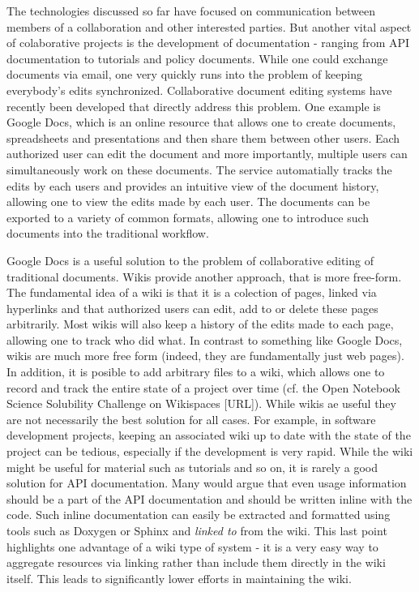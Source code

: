 \documentclass[12pt]{book}
\begin{document}
The technologies discussed so far have focused on communication
between members of a collaboration and other interested parties. But
another vital aspect of colaborative projects is the development of
documentation - ranging from API documentation to tutorials and policy
documents. While one could exchange documents via email, one very
quickly runs into the problem of keeping everybody's edits
synchronized. Collaborative document editing systems have recently
been developed that directly address this problem. One example is
Google Docs, which is an online resource that allows one to create
documents, spreadsheets and presentations and then share them between
other users. Each authorized user can edit the document and more
importantly, multiple users can simultaneously work on these
documents. The service automatially tracks the edits by each users and
provides an intuitive view of the document history, allowing one to
view the edits made by each user. The documents can be exported to a
variety of common formats, allowing one to introduce such documents
into the traditional workflow.

Google Docs is a useful solution to the problem of collaborative
editing of traditional documents. Wikis provide another approach, that
is more free-form. The fundamental idea of a wiki is that it is a
colection of pages, linked via hyperlinks and that authorized users
can edit, add to or delete these pages arbitrarily. Most wikis will
also keep a history of the edits made to each page, allowing one to
track who did what. In contrast to something like Google Docs, wikis
are much more free form (indeed, they are fundamentally just web
pages). In addition, it is posible to add arbitrary files to a wiki,
which allows one to record and track the entire state of a project
over time (cf. the Open Notebook Science Solubility Challenge on
Wikispaces [URL]). While wikis ae useful they are not necessarily the
best solution for all cases. For example, in software development
projects, keeping an associated wiki up to date with the state of the
project can be tedious, especially if the development is very
rapid. While the wiki might be useful for material such as tutorials
and so on, it is rarely a good solution for API documentation. Many
would argue that even usage information should be a part of the API
documentation and should be written inline with the code. Such inline
documentation can easily be extracted and formatted using tools such
as Doxygen or Sphinx and \emph{linked to} from the wiki. This last
point highlights one advantage of a wiki type of system - it is a very
easy way to aggregate resources via linking rather than include them
directly in the wiki itself. This leads to significantly lower efforts
in maintaining the wiki.
\end{document}
